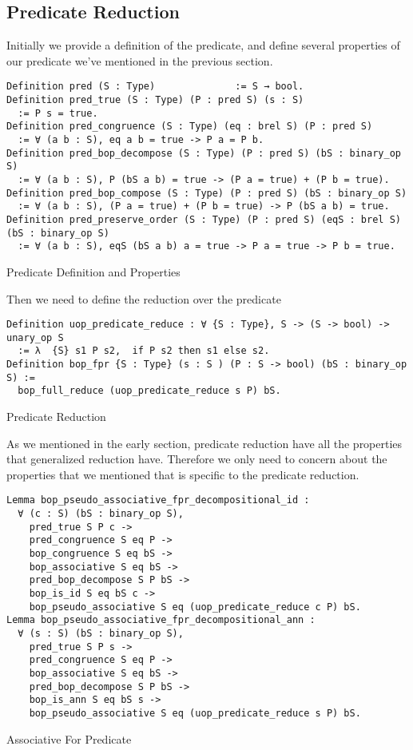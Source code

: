 \subsection{Predicate Reduction}
Initially we provide a definition of the predicate, and define several properties of our predicate we've mentioned in the previous section.
\begin{listing}[H]
\begin{verbatim}
Definition pred (S : Type)              := S → bool.
Definition pred_true (S : Type) (P : pred S) (s : S) 
  := P s = true. 
Definition pred_congruence (S : Type) (eq : brel S) (P : pred S) 
  := ∀ (a b : S), eq a b = true -> P a = P b.
Definition pred_bop_decompose (S : Type) (P : pred S) (bS : binary_op S) 
  := ∀ (a b : S), P (bS a b) = true -> (P a = true) + (P b = true).
Definition pred_bop_compose (S : Type) (P : pred S) (bS : binary_op S) 
  := ∀ (a b : S), (P a = true) + (P b = true) -> P (bS a b) = true.
Definition pred_preserve_order (S : Type) (P : pred S) (eqS : brel S) (bS : binary_op S)
  := ∀ (a b : S), eqS (bS a b) a = true -> P a = true -> P b = true.
\end{verbatim}
\caption{Predicate Definition and Properties} 
\label{coq:def:predicate}
\end{listing}
Then we need to define the reduction over the predicate 
\begin{listing}[H]
\begin{verbatim}
Definition uop_predicate_reduce : ∀ {S : Type}, S -> (S -> bool) -> unary_op S 
  := λ  {S} s1 P s2,  if P s2 then s1 else s2.
Definition bop_fpr {S : Type} (s : S ) (P : S -> bool) (bS : binary_op S) := 
  bop_full_reduce (uop_predicate_reduce s P) bS.
\end{verbatim}
\caption{Predicate Reduction} 
\label{coq:def:predicate_reduction}
\end{listing}
As we mentioned in the early section, predicate reduction have all the properties that generalized reduction have. Therefore we only need to concern about the properties that we mentioned that is specific to the predicate reduction.
\begin{listing}[H]
\begin{verbatim}
Lemma bop_pseudo_associative_fpr_decompositional_id :
  ∀ (c : S) (bS : binary_op S),
    pred_true S P c ->
    pred_congruence S eq P ->
    bop_congruence S eq bS ->     
    bop_associative S eq bS -> 
    pred_bop_decompose S P bS ->
    bop_is_id S eq bS c -> 
    bop_pseudo_associative S eq (uop_predicate_reduce c P) bS. 
Lemma bop_pseudo_associative_fpr_decompositional_ann :
  ∀ (s : S) (bS : binary_op S),
    pred_true S P s -> 
    pred_congruence S eq P ->
    bop_associative S eq bS ->    
    pred_bop_decompose S P bS ->
    bop_is_ann S eq bS s ->     
    bop_pseudo_associative S eq (uop_predicate_reduce s P) bS.

\end{verbatim}
\caption{Associative For Predicate} 
\label{coq:proof:predicate_associative}
\end{listing}
